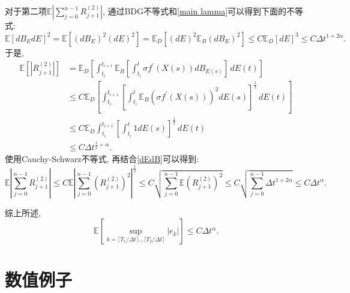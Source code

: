 \documentclass[12pt, final]{article}
\makeatletter
\numberwithin{equation}{section}
\numberwithin{figure}{section}
\numberwithin{table}{section}
\theoremstyle{plain}
\renewcommand{\proofname}{证明}
\theoremstyle{Definition}
\theoremstyle{Remark}
\renewenvironment{proof}[1][\proofname]{\par
	\pushQED{\qed}%
	\normalfont \topsep6\p@\@plus6\p@\relax
	\trivlist\item[\hskip\labelsep
	\bfseries #1\@addpunct{\, :\, }]\ignorespaces
}{%
	\popQED\endtrivlist\@endpefalse
}
\makeatother
\begin{document}
\begin{proof}
		对于第二项$\mathbb{E}|\sum\limits_{j=0}^{n-1}R_{j+1}^{(2)}|$, 
		通过BDG不等式和\cref{main lamma}可以得到下面的不等式:
		\begin{equation}\label{dEdB}
			\mathbb{E}[dB_EdE]^2=\mathbb{E}[(dB_E)^2(dE)^2]=\mathbb{E}_D[(dE)^2\mathbb{E}_B(dB_E)^2]\leq
			C\mathbb{E}_{D}[dE]^3\leq C\Delta t ^{1+2\alpha}. 
		\end{equation}
		于是, 
		\begin{align*}
			\mathbb{E} \left[|R_{j+1}^{(2)}| \right] &= \mathbb{E}_D \left[
			\int_{t_i}^{t_{i+1}} \mathbb{E}_B  \left[\int_{t_i}^{t}  \sigma f^{\prime}(X(s)) dB_{E(s)}\right] \, dE(t)
			\right] \\
			& \le C\mathbb{E}_D \left[
			\int_{t_i}^{t_{i+1}} \left[\int_{t_i}^{t}  \mathbb{E}_B\left(\sigma f^{\prime}(X(s))\right)^2 dE(s)\right]^{\frac{1}{2}} \, dE(t)
			\right] \\
			&\le C \mathbb{E}_D 
			\int_{t_i}^{t_{i+1}} \left[\int_{t_i}^{t}  1 dE(s)\right]^{\frac{1}{2}} \, dE(t)\\
			&\le C\Delta t^{\frac{1}{2}+\alpha}. 
		\end{align*}
		使用Cauchy-Schwarz不等式, 再结合\cref{dEdB}可以得到:
		\begin{equation*}
			\mathbb{E}\left|\sum_{j=0}^{n-1}R_{j+1}^{(2)}\right|  \le C\mathbb{E} \left|\sum_{j=0}^{n-1}(R_{j+1}^{(2)})^2\right|^{\frac{1}{2}} \le C\sqrt{\sum_{j=0}^{n-1}\mathbb{E}(R_{j+1}^{(2)})^2}
			\le C\sqrt{\sum_{j=0}^{n-1}\Delta t^{1+2\alpha}} \le C\Delta t^{\alpha}. 
		\end{equation*}

		综上所述, $$\mathbb{E}\left[\sup\limits_{k=\lceil T_1/\Delta t \rceil \ldots \lceil T_2/\Delta t \rceil}\left|e_k\right|\right] \leq C\Delta t^\alpha. $$
	\end{proof}
	
	\section{数值例子}

	
	
\end{document}
